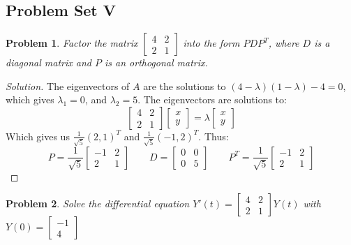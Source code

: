 \documentclass{article}
\theoremstyle{mystyle}
\newtheorem{problem}{Problem}[section]
\begin{document}
\subsection{Problem Set V}
\begin{problem}
Factor the matrix $\begin{bmatrix} 4 & 2 \\ 2 & 1 \end{bmatrix}$ into the form $PDP^T$, where $D$ is a diagonal matrix and $P$ is an orthogonal matrix.
\end{problem}
\begin{proof}[Solution]
The eigenvectors of $A$ are the solutions to $(4-\lambda)(1-\lambda)-4=0$, which gives $\lambda_1 = 0$, and $\lambda_2 = 5$. The eigenvectors are solutions to:
%
\begin{equation*}
    \begin{bmatrix} 4 & 2 \\ 2 & 1 \end{bmatrix} \begin{bmatrix} x \\ y \end{bmatrix} = \lambda \begin{bmatrix} x \\ y \end{bmatrix}
\end{equation*}
%
Which gives us $\frac{1}{\sqrt{5}}(2,1)^T$ and $\frac{1}{\sqrt{5}}(-1,2)^T$. Thus:
%
\begin{equation*}
    P = \frac{1}{\sqrt{5}}\begin{bmatrix} -1 & 2 \\ 2 & 1 \end{bmatrix}\quad\quad D = \begin{bmatrix} 0 & 0 \\ 0 & 5 \end{bmatrix}\quad\quad P^{T} = \frac{1}{\sqrt{5}}\begin{bmatrix} -1 & 2 \\ 2 & 1 \end{bmatrix}
\end{equation*}
\end{proof}
\begin{problem}
Solve the differential equation $Y'(t) = \begin{bmatrix} 4 & 2 \\ 2 & 1 \end{bmatrix} Y(t)$ with $Y(0) = \begin{bmatrix} -1 \\ 4 \end{bmatrix}$
\end{problem}
\end{document}
